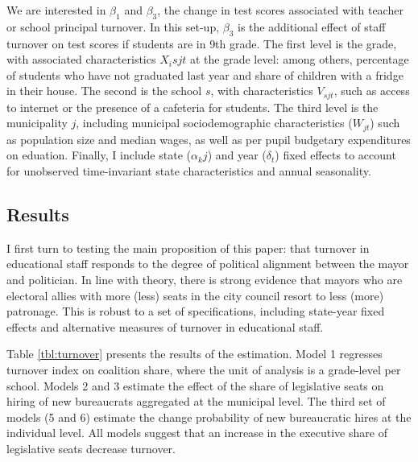 We are interested in $\beta_1$ and $\beta_3$, the change in test scores associated with teacher or school principal turnover. In this set-up, $\beta_3$ is the additional effect of staff turnover on test scores if students are in 9th grade. The first level is the grade, with associated characteristics $X_isjt$ at the grade level: among others, percentage of students who have not graduated last year and share of children with a fridge in their house. The second is the school $s$, with characteristics $V_{sjt}$, such as access to internet or the presence of a cafeteria for students. The third level is the municipality $j$, including municipal sociodemographic characteristics ($W_{jt}$) such as population size and median wages, as well as per pupil budgetary expenditures on eduation. Finally, I include state ($\alpha_kj$) and year ($\delta_t$) fixed effects to account for unobserved time-invariant state characteristics and annual seasonality.


\subsection*{Results}

I first turn to testing the main proposition of this paper: that turnover in educational staff responds to the degree of political alignment between the mayor and politician. In line with theory, there is strong evidence that mayors who are electoral allies with more (less) seats in the city council resort to less (more) patronage. This is robust to a set of specifications, including state-year fixed effects and alternative measures of turnover in educational staff. 

Table \ref{tbl:turnover} presents the results of the estimation. Model 1 regresses turnover index on coalition share, where the unit of analysis is a grade-level per school. Models 2 and 3 estimate the effect of the share of legislative seats on hiring of new bureaucrats aggregated at the municipal level. The third set of models (5 and 6) estimate the change probability of new bureaucratic hires at the individual level. All models suggest that an increase in the executive share of legislative seats decrease turnover.

